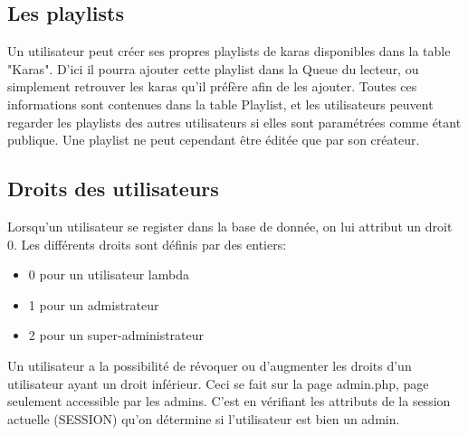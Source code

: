 \subsection{Les playlists}

Un utilisateur peut créer ses propres playlists de karas disponibles dans la table "Karas".
D'ici il pourra ajouter cette playlist dans la Queue du lecteur, ou simplement retrouver les karas qu'il préfère afin de les ajouter.
Toutes ces informations sont contenues dans la table Playlist, et les utilisateurs peuvent regarder les playlists des autres utilisateurs si elles sont paramétrées comme étant publique.\newline
Une playlist ne peut cependant être éditée que par son créateur.\newline

\subsection{Droits des utilisateurs}
Lorsqu'un utilisateur se register dans la base de donnée, on lui attribut un droit 0. Les différents droits sont définis par des entiers:
\begin{itemize}
	\item 0 pour un utilisateur lambda
	\item 1 pour un admistrateur
	\item 2 pour un super-administrateur
\end{itemize}
Un utilisateur a la possibilité de révoquer ou d'augmenter les droits d'un utilisateur ayant un droit inférieur. Ceci se fait sur la page admin.php, page seulement accessible par les admins. C'est en vérifiant les attributs de la session actuelle (SESSION) qu'on détermine si l'utilisateur est bien un admin.
